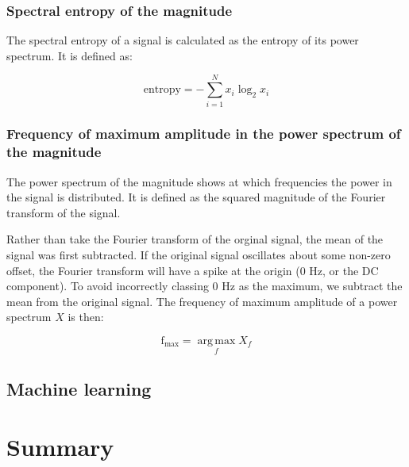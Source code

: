       \subsubsection{Spectral entropy of the magnitude}
        The spectral entropy of a signal is calculated as the entropy of its power spectrum. It is defined as:

        $$\mathrm{entropy} = -\sum\limits_{i=1}^N x_i \log_2 x_i$$
      \subsubsection{Frequency of maximum amplitude in the power spectrum of the magnitude}
        The power spectrum of the magnitude shows at which frequencies the power in the signal is distributed. It is defined as the squared magnitude of the Fourier transform of the signal.
        
        Rather than take the Fourier transform of the orginal signal, the mean of the signal was first subtracted. If the original signal oscillates about some non-zero offset, the Fourier transform will have a spike at the origin (0 \si{Hz}, or the DC component). To avoid incorrectly classing 0 \si{Hz} as the maximum, we subtract the mean from the original signal. The frequency of maximum amplitude of a power spectrum $X$ is then:
        
        $$\mathrm{f}_\mathrm{max} = \operatorname*{arg\,max}_f X_f$$
        
    \subsection{Machine learning}
  \section{Summary}

